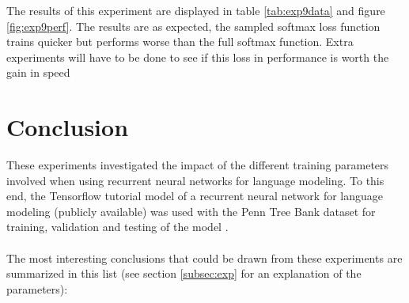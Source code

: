 \documentclass[10pt,a4paper,titlepage]{article}
\begin{document}
The results of this experiment are displayed in table \ref{tab:exp9data} and figure \ref{fig:exp9perf}. The results are as expected, the sampled softmax loss function trains quicker but performs worse than the full softmax function. Extra experiments will have to be done to see if this loss in performance is worth the gain in speed

\newpage





%
%
%

\section{Conclusion}

These experiments investigated the impact of the different training parameters involved when using recurrent neural networks for language modeling. To this end, the Tensorflow tutorial model of a recurrent neural network for language modeling (publicly available) was used with the Penn Tree Bank dataset for training, validation and testing of the model \cite{tensorflow}.\\
\\
The most interesting conclusions that could be drawn from these experiments are summarized in this list (see section \ref{subsec:exp} for an explanation of the parameters):
\end{document}
